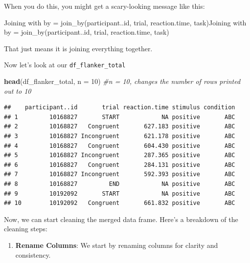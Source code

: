 \documentclass[
]{book}
\newenvironment{Shaded}{\begin{snugshade}}{\end{snugshade}}
\newcommand{\AttributeTok}[1]{\textcolor[rgb]{0.13,0.29,0.53}{#1}}
\newcommand{\CommentTok}[1]{\textcolor[rgb]{0.56,0.35,0.01}{\textit{#1}}}
\newcommand{\DecValTok}[1]{\textcolor[rgb]{0.00,0.00,0.81}{#1}}
\newcommand{\FunctionTok}[1]{\textcolor[rgb]{0.13,0.29,0.53}{\textbf{#1}}}
\newcommand{\NormalTok}[1]{#1}
\newcommand{\StringTok}[1]{\textcolor[rgb]{0.31,0.60,0.02}{#1}}
\providecommand{\tightlist}{%
  \setlength{\itemsep}{0pt}\setlength{\parskip}{0pt}}
\begin{document}
When you do this, you might get a scary-looking message like this:

\begin{Shaded}
\begin{Highlighting}[]
\NormalTok{Joining with }\StringTok{\textasciigrave{}}\AttributeTok{by = join\_by(participant..id, trial, reaction.time, task)}\StringTok{\textasciigrave{}}\NormalTok{Joining with }\StringTok{\textasciigrave{}}\AttributeTok{by = join\_by(participant..id, trial, reaction.time, task)}\StringTok{\textasciigrave{}}
\end{Highlighting}
\end{Shaded}

That just means it is joining everything together.

Now let's look at our \texttt{df\_flanker\_total}

\begin{Shaded}
\begin{Highlighting}[]
\FunctionTok{head}\NormalTok{(df\_flanker\_total, }\AttributeTok{n =} \DecValTok{10}\NormalTok{) }\CommentTok{\#n = 10, changes the number of rows printed out to 10}
\end{Highlighting}
\end{Shaded}

\begin{verbatim}
##    participant..id       trial reaction.time stimulus condition
## 1         10168827       START            NA positive       ABC
## 2         10168827   Congruent       627.183 positive       ABC
## 3         10168827 Incongruent       621.178 positive       ABC
## 4         10168827   Congruent       604.430 positive       ABC
## 5         10168827 Incongruent       287.365 positive       ABC
## 6         10168827   Congruent       284.131 positive       ABC
## 7         10168827 Incongruent       592.393 positive       ABC
## 8         10168827         END            NA positive       ABC
## 9         10192092       START            NA positive       ABC
## 10        10192092   Congruent       661.832 positive       ABC
\end{verbatim}

Now, we can start cleaning the merged data frame. Here's a breakdown of the cleaning steps:

\begin{enumerate}
\def\labelenumi{\arabic{enumi}.}
\tightlist
\item
  \textbf{Rename Columns}: We start by renaming columns for clarity and consistency.
\end{enumerate}
\end{document}
